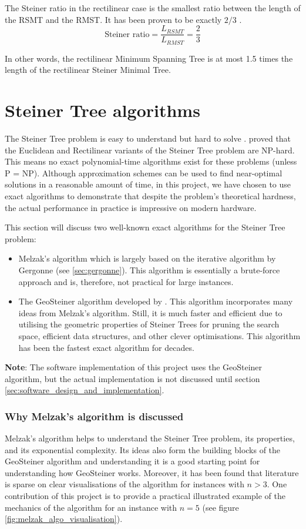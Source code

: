 \documentclass{l4proj}
\begin{document}
The Steiner ratio in the rectilinear case is the smallest ratio between the length of the RSMT and the RMST. It has been proven to be exactly $2/3$ \cite{Brazil2015}.
$$
    \text{Steiner ratio} = \frac{L_{RSMT}}{L_{RMST}} = \frac{2}{3}
$$

In other words, the rectilinear Minimum Spanning Tree is at most 1.5 times the length of the rectilinear Steiner Minimal Tree.

\section{Steiner Tree algorithms}
\label{sec:algorithms}
The Steiner Tree problem is easy to understand but hard to solve \citep{Brazil2015}. \cite{Garey1977} proved that the Euclidean and Rectilinear variants of the Steiner Tree problem are NP-hard. This means no exact polynomial-time algorithms exist for these problems (unless P = NP).
Although approximation schemes can be used to find near-optimal solutions in a reasonable amount of time, in this project, we have chosen to use exact algorithms to demonstrate that despite the problem's theoretical hardness, the actual performance in practice is impressive on modern hardware.

This section will discuss two well-known exact algorithms for the Steiner Tree problem:
\begin{itemize}
    \item Melzak's algorithm \cite{MelzakAlgo} which is largely based on the iterative algorithm by Gergonne \citep{Brazil2014} (see \ref{sec:gergonne}). This algorithm is essentially a brute-force approach and is, therefore, not practical for large instances.
    \item The GeoSteiner algorithm developed by \cite{geosteiner96}. This algorithm incorporates many ideas from Melzak's algorithm. Still, it is much faster and efficient due to utilising the geometric properties of Steiner Trees for pruning the search space, efficient data structures, and other clever optimisations. This algorithm has been the fastest exact algorithm for decades.
\end{itemize}
\textbf{Note}: The software implementation of this project uses the GeoSteiner algorithm, but the actual implementation is not discussed until section \ref{sec:software_design_and_implementation}.

\subsubsection{Why Melzak's algorithm is discussed}
Melzak's algorithm helps to understand the Steiner Tree problem, its properties, and its exponential complexity. Its ideas also form the building blocks of the GeoSteiner algorithm and understanding it is a good starting point for understanding how GeoSteiner works. Moreover, it has been found that literature is sparse on clear visualisations of the algorithm for instances with $n>3$. One contribution of this project is to provide a practical illustrated example of the mechanics of the algorithm for an instance with $n=5$ (see figure \ref{fig:melzak_algo_visualisation}).
\end{document}
